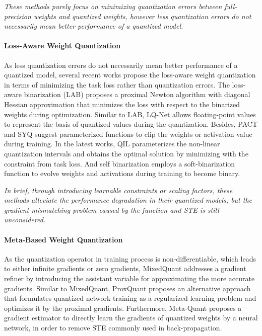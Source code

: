 \documentclass[runningheads]{llncs}
\begin{document}
\emph{These methods purely focus on
minimizing quantization errors between full-precision weights and quantized weights,
however less quantization errors do not necessarily mean better performance of a quantized model.}

\paragraph{\textbf{Loss-Aware Weight Quantization}}
As less quantization errors do not necessarily mean better performance of a quantized model,
several recent works propose the loss-aware weight quantization in terms of
minimizing the task loss rather than quantization errors.
The loss-aware binarization (LAB) \cite{hou2016loss} proposes
a proximal Newton algorithm with diagonal Hessian approximation that
minimizes the loss with respect to the binarized weights during optimization.
Similar to LAB, LQ-Net \cite{Zhang2018LQ}
allows floating-point values to represent the basis of quantized values during the quantization.
Besides, PACT \cite{pact2018} and SYQ \cite{Faraone2018syq}
suggest parameterized functions to clip the weights or activation value during training.
In the latest works, QIL \cite{jung2019learning} parameterizes the non-linear quantization intervals and
obtains the optimal solution by minimizing with the constraint from task loss.
And self binarization \cite{lahoud2019self} employs a soft-binarization function
to evolve weights and activations during training to become binary.

\emph{In brief, through introducing learnable constraints or scaling factors,
these methods alleviate the performance degradation in their quantized models,
but the gradient mismatching problem caused by the  function and STE \cite{alizadeh2019a} is still unconsidered.}

\paragraph{\textbf{Meta-Based Weight Quantization}}
As the quantization operator in training process is non-differentiable,
which leads to either infinite gradients or zero gradients,
MixedQuant \cite{Uhlich2019DQ} addresses a gradient refiner by introducing the assistant variable
for approximating the more accurate gradients.
Similar to MixedQuant, ProxQuant \cite{bai2019prox} proposes an alternative approach that
formulates quantized network training as a regularized learning problem
and optimizes it by the proximal gradients.
Furthermore, Meta-Quant \cite{chen2019meta} proposes a gradient estimator to directly
learn the gradients of quantized weights by a neural network,
in order to remove STE commonly used in back-propagation.
\end{document}
